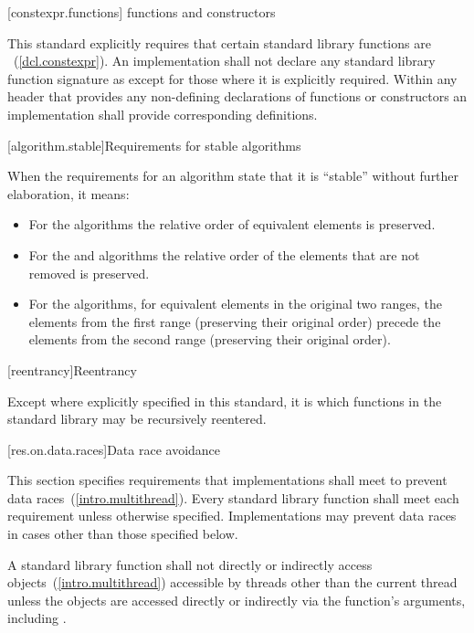 [constexpr.functions]{ functions and constructors}

\pnum
This standard explicitly requires that certain standard library functions are
~(\ref{dcl.constexpr}). An implementation shall not declare
any standard library function signature as  except for those where
it is explicitly required.
Within any header that provides any non-defining declarations of 
functions or constructors an implementation shall provide corresponding definitions.

[algorithm.stable]{Requirements for stable algorithms}

\pnum
{}%
%
When the requirements for an algorithm state that it is ``stable'' without further elaboration,
it means:

\begin{itemize}
\item For the  algorithms the relative order of equivalent
elements is preserved.

\item For the  and  algorithms the relative order of
the elements that are not removed is preserved.

\item For the  algorithms, for equivalent elements in
the original two ranges, the elements from the first range (preserving their
original order) precede the elements from the second range (preserving their
original order).
\end{itemize}

[reentrancy]{Reentrancy}

\pnum
Except where explicitly specified in this standard, it is  which functions in the \Cpp standard
library may be recursively reentered.

[res.on.data.races]{Data race avoidance}

\pnum
This section specifies requirements that implementations shall meet to prevent data
races~(\ref{intro.multithread}).
Every standard library function shall meet each requirement unless otherwise specified.
Implementations may prevent data races in cases other than those specified below.

\pnum
A \Cpp standard library function shall not directly or indirectly access
objects~(\ref{intro.multithread}) accessible by threads other than the current thread
unless the objects are accessed directly or indirectly via the function's arguments,
including .

